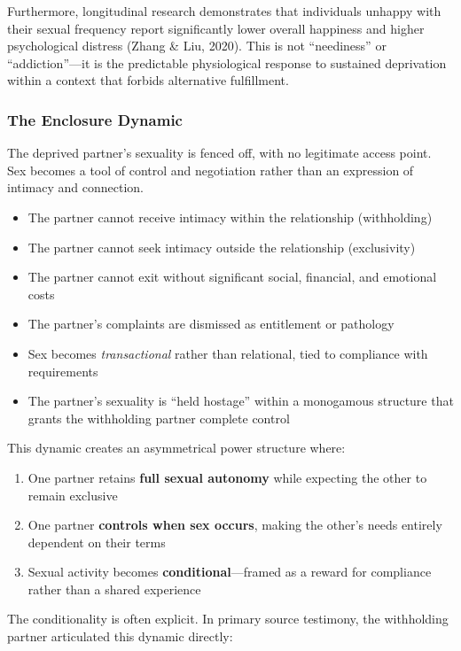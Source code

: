 \documentclass[12pt, letterpaper]{article}
\begin{document}
Furthermore, longitudinal research demonstrates that individuals unhappy with their sexual frequency report significantly lower overall happiness and higher psychological distress (Zhang \& Liu, 2020). This is not ``neediness'' or ``addiction''---it is the predictable physiological response to sustained deprivation within a context that forbids alternative fulfillment.

\subsubsection{The Enclosure Dynamic}

The deprived partner's sexuality is fenced off, with no legitimate access point. Sex becomes a tool of control and negotiation rather than an expression of intimacy and connection.

\begin{itemize}
    \item The partner cannot receive intimacy within the relationship (withholding)
    \item The partner cannot seek intimacy outside the relationship (exclusivity)
    \item The partner cannot exit without significant social, financial, and emotional costs
    \item The partner's complaints are dismissed as entitlement or pathology
    \item Sex becomes \textit{transactional} rather than relational, tied to compliance with requirements
    \item The partner's sexuality is ``held hostage'' within a monogamous structure that grants the withholding partner complete control
\end{itemize}

This dynamic creates an asymmetrical power structure where:

\begin{enumerate}
    \item One partner retains \textbf{full sexual autonomy} while expecting the other to remain exclusive
    \item One partner \textbf{controls when sex occurs}, making the other's needs entirely dependent on their terms
    \item Sexual activity becomes \textbf{conditional}---framed as a reward for compliance rather than a shared experience
\end{enumerate}

The conditionality is often explicit. In primary source testimony, the withholding partner articulated this dynamic directly:
\end{document}
